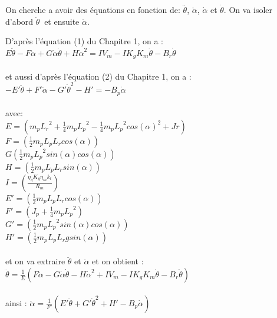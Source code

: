 \documentclass[12pt, a4paper, openany]{report}
\begin{document}
   On cherche a avoir des équations en fonction de:  $\ddot{\theta }$, $\ddot{\alpha}$, $\dot{\alpha}$ et $\dot{\theta}$. On va isoler d'abord $\ddot{\theta }\:$ et ensuite $\ddot{\alpha}$.

D'après l'équation (1) du Chapitre 1, on a : \\


    $E\ddot{\theta }-F\ddot{\alpha}+ G\dot{\alpha}\dot{\theta}+H\dot{\alpha}^2=IV_{m}-IK_{g}K_{m}\dot{\theta}-B_{r}\dot{\theta}$\\\\

et aussi d'après l'équation (2) du Chapitre 1, on a :\\ 


$-{E}'\ddot{\theta}+{F}'\ddot{\alpha}-{G}'\dot{\theta}^2-{H}'=-B_{p}\dot{\alpha}$ \\\\

avec: \\

$E=(m_{p}{L_{r}}^2+\frac{1}{4}m_{p}{L_{p}}^2-\frac{1}{4}m_{p}{L_{p}}^2cos({\alpha})^2+Jr)$ \\

$F=(\frac{1}{2}m_{p}L_{p}L_{r}cos(\alpha))$\\

$G(\frac{1}{2}m_{p}{L_{p}}^2sin(\alpha)cos(\alpha))$\\

$H=(\frac{1}{2}m_{p}L_{p}L_{r}sin(\alpha))$\\

$I=(\frac{\eta_{g}K_{g}\eta_{m}k_{t}}{R_{m}})$\\

${E}'=(\frac{1}{2}m_{p}L_{p}L_{r}cos(\alpha))$\\

${F}'=(J_{p}+\frac{1}{4}m_{p}{L_{p}}^2)$\\

${G}'=(\frac{1}{2}m_{p}{L_{p}}^2sin(\alpha)cos(\alpha))$\\

${H}'=(\frac{1}{2}m_{p}L_{p}L_{r}gsin(\alpha))$\\\\

et on va extraire $\ddot{\theta }$ et $\ddot{\alpha}$ et on obtient :\\

 $\ddot{\theta }=\frac{1}{E}(F\ddot{\alpha}-G\dot{\alpha}\dot{\theta}-H\dot{\alpha}^2+IV_{m}-IK_{g}K_{m}\dot{\theta}-B_{r}\dot{\theta})$\\\\
   ainsi :
   $\ddot{\alpha}=\frac{1}{{F}'}({E}'\ddot{\theta}+{G}'\dot{\theta}^2+{H}'-B_{p}\dot{\alpha})$ \\
\end{document}
